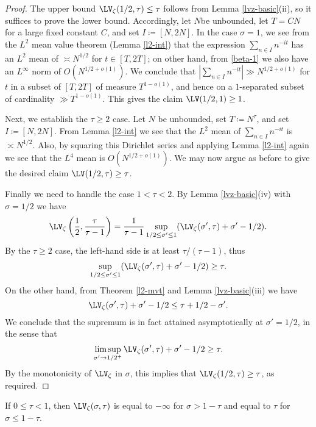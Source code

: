 \begin{proof}  The upper bound $\LV_\zeta(1/2,\tau) \leq \tau$  follows from Lemma \ref{lvz-basic}(ii), so it suffices to prove the lower bound.  Accordingly, let $N$be unbounded, let $T  = CN$ for a large fixed constant $C$, and set $I \coloneqq [N,2N]$.  In the case $\sigma=1$, we see from the $L^2$ mean value theorem (Lemma \ref{l2-int}) that the expression $\sum_{n \in I} n^{-it}$ has an $L^2$ mean of $\asymp N^{1/2}$ for $t \in [T,2T]$; on other hand, from \eqref{beta-1} we also have an $L^\infty$ norm of $O(N^{1/2+o(1)})$.  We conclude that $|\sum_{n \in I} n^{-it}| \gg N^{1/2+o(1)}$ for $t$ in a subset of $[T,2T]$ of measure $T^{1-o(1)}$, and hence on a $1$-separated subset of cardinality $\gg T^{1-o(1)}$.  This gives the claim $\LV(1/2,1) \geq 1$.

Next, we establish the $\tau \geq 2$ case.
Let $N$ be unbounded, set $T \coloneqq N^\tau$, and set $I \coloneqq [N,2N]$.  From Lemma \ref{l2-int} we see that the $L^2$ mean of $\sum_{n \in I} n^{-it}$ is $\asymp N^{1/2}$.  Also, by squaring this Dirichlet series and applying Lemma \ref{l2-int} again we see that the $L^4$ mean is $O(N^{1/2+o(1)})$.  We may now argue as before to give the desired claim $\LV(1/2,\tau) \geq \tau$.

Finally we need to handle the case $1 < \tau < 2$. By Lemma \ref{lvz-basic}(iv) with $\sigma=1/2$ we have
$$ \LV_\zeta\left(\frac{1}{2}, \frac{\tau}{\tau-1}\right) = \frac{1}{\tau-1}  \sup_{1/2 \leq \sigma' \leq 1} (\LV_\zeta(\sigma',\tau) + \sigma'-1/2).$$ 
By the $\tau \geq 2$ case, the left-hand side is at least $\tau/(\tau-1)$, thus
$$ \sup_{1/2 \leq \sigma' \leq 1} (\LV_\zeta(\sigma',\tau) + \sigma'-1/2) \geq \tau.$$
On the other hand, from Theorem \ref{l2-mvt} and Lemma \ref{lvz-basic}(iii) we have
$$ \LV_\zeta(\sigma',\tau) + \sigma'-1/2 \leq \tau + 1/2 - \sigma'.$$
We conclude that the supremum is in fact attained asymptotically at $\sigma'=1/2$, in the sense that
$$ \limsup_{\sigma' \to 1/2^+} \LV_\zeta(\sigma',\tau) + \sigma'-1/2 \geq \tau.$$
By the monotonicity of $\LV_\zeta$ in $\sigma$, this implies that $\LV_\zeta(1/2,\tau) \geq \tau$, as required.
\end{proof}

\begin{lemma}\label{lvz-small-tau} If $0 \leq \tau < 1$, then $\LV_\zeta(\sigma,\tau)$ is equal to $-\infty$ for $\sigma > 1-\tau$ and equal to $\tau$ for $\sigma \leq 1-\tau$.
\end{lemma}

